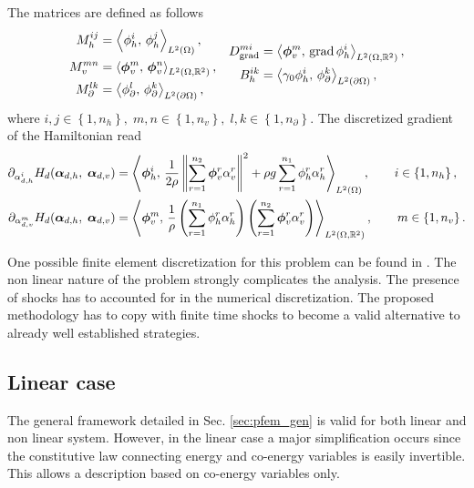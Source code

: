 The matrices are defined as follows 
\begin{equation}
\begin{aligned}
M_h^{ij} &= \inner[L^2(\Omega)]{\phi_h^i}{\phi_h^j}, \\
M_v^{mn} &= \inner[L^2(\Omega, \mathbb{R}^2)]{\bm\phi_v^m}{\bm\phi_v^n}, \\
M_\partial^{lk} &= \inner[L^2(\partial\Omega)]{\phi_\partial^l}{\phi_\partial^k},
\end{aligned}\quad
\begin{aligned}
{D}_{\grad}^{mi} &= \inner[L^2(\Omega, \mathbb{R}^2)]{\bm\phi_v^m}{\grad \phi_h^i}, \\
{B}_{h}^{ik} &= \inner[L^2(\partial\Omega)]{\gamma_0 \phi_h^i}{\phi_\partial^k}, \\
\end{aligned}
\end{equation}
where $i, j \in \left\{1, n_h\right\}, \; m,n \in \left\{1, n_v\right\}, \; l, k \in \left\{1, n_\partial \right\}$. 
The discretized gradient of the Hamiltonian read
\begin{equation}
\begin{aligned}
\partial_{{\alpha}_{d, h}^i} H_d(\bm{\alpha}_{d, h},\; \bm{\alpha}_{d, v}) &= \inner[L^2(\Omega)]{\bm\phi_h^i}{\frac{1}{2 \rho} \norm{\sum_{r=1}^{n_2} \bm{\phi}_v^r \alpha_v^r}^2 + \rho g \sum_{r=1}^{n_1} {\phi}_h^r \alpha_h^r}, \qquad i \in \left\{1, n_h\right\}, \\
\partial_{{\alpha}_{d, v}^m} H_d(\bm{\alpha}_{d, h},\; \bm{\alpha}_{d, v}) &= \inner[L^2(\Omega, \mathbb{R}^2)]{\bm\phi_v^m}{\frac{1}{\rho} \left(\sum_{r=1}^{n_1} {\phi}_h^r \alpha_h^r\right) \left(\sum_{r=1}^{n_2} \bm{\phi}_v^r \alpha_v^r \right)}, \qquad m \in \left\{1, n_v\right\}.
\end{aligned}
\end{equation}

One possible finite element discretization for this problem can be found in \cite{pironneau1989finite}. The non linear nature of the problem strongly complicates the analysis. The presence of shocks has to accounted for in the numerical discretization. The proposed methodology has to copy with finite time shocks to become a valid alternative to already well established strategies.


\subsection{Linear case}
The general framework detailed in Sec. \ref{sec:pfem_gen} is valid for both linear and non linear system. However, in the linear case a major simplification occurs since the constitutive law connecting energy and co-energy variables is easily invertible. This allows a description based on co-energy variables only. \\

